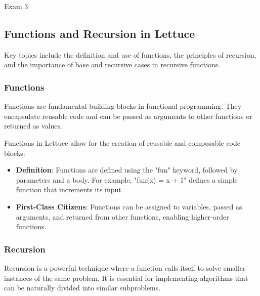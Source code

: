 \begin{examnotes}{Exam 3}
    \subsection*{Functions and Recursion in Lettuce}

    Key topics include the definition and use of functions, the principles of recursion, and the importance of base and recursive cases in recursive functions.
    
    \subsubsection*{Functions}
    
    Functions are fundamental building blocks in functional programming. They encapsulate reusable code and can be passed as arguments to other functions or returned as values.
    
    \begin{highlight}
        Functions in Lettuce allow for the creation of reusable and composable code blocks:
        \begin{itemize}
            \item \textbf{Definition}: Functions are defined using the "fun" keyword, followed by parameters and a body. For example, "fun(x) = x + 1" defines a simple function that increments its input.
            \item \textbf{First-Class Citizens}: Functions can be assigned to variables, passed as arguments, and returned from other functions, enabling higher-order functions.
        \end{itemize}
    \end{highlight}
    
    \subsubsection*{Recursion}
    
    Recursion is a powerful technique where a function calls itself to solve smaller instances of the same problem. It is essential for implementing algorithms that can be naturally divided into similar subproblems.
    

\end{examnotes}
